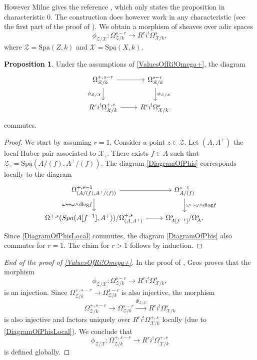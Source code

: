 \documentclass{amsart}
\def\Spa{\textrm{Spa}}
\theoremstyle{definition}
\newtheorem{proposition}[theorem]{Proposition}
\newcommand\dlog{\mathrm{dlog}}
\numberwithin{equation}{section}
\begin{document}
However Milne gives the reference \cite[III.8]{HartshorneAmple}, which only states the proposition in characteristic $0$. The construction does however work in any characteristic (see the first part of the proof of \cite[Theorem III.8.1]{HartshorneAmple}). We obtain a morphism of sheaves over adic spaces
\[
\phi_{\mathcal{Z}/\mathcal{X}}:\Omega_{\mathcal{Z}/k}^{s-r}\to R^ri^!\Omega_{\mathcal{X}/k}^s,
\]
where $\mathcal{Z}=\Spa(Z,k)$ and $\mathcal{X}=\Spa(X,k)$.

\begin{proposition}\label{CommutingLocal}
	Under the assumptions of \cref{ValuesOfRi!Omega+}, the diagram
	\begin{equation}\label{DiagramOfPhis}
		\begin{tikzcd}
			\Omega_{\mathcal{Z}/k}^{+,s-r}\ar[r]\ar[d,swap,"\phi_{\mathcal{Z}/\mathcal{X}}"]&\Omega_{\mathcal{Z}/k}^{s-r}\ar[d,"\phi_{\mathcal{Z}/\mathcal{X}}"]\\ 
			R^ri^!\Omega_{\mathcal{X}/k}^{+,s}\ar[r]& R^ri^!\Omega_{\mathcal{X}/k}^s.
		\end{tikzcd}
	\end{equation}
	commutes.
\end{proposition}
\begin{proof}
	We start by assuming $r=1$. Consider a point $z\in \mathcal{Z}$. Let $(A,A^+)$ the local Huber pair associated to $\mathcal{X}_z$. There exists $f\in A$ such that $\mathcal{Z}_z=\Spa(A/(f),A^+/(f))$. The diagram \eqref{DiagramOfPhis} corresponds locally to the diagram
	\begin{equation}\label{DiagramOfPhisLocal}
		\begin{tikzcd}
			\Omega_{(A/(f),A^+/(f))}^{+,s-1}\ar[r]\ar[d,swap,"\omega\mapsto \omega\wedge\dlog f"]&\Omega_{A/(f)}^{s-1}\ar[d,"\omega\mapsto \omega\wedge\dlog f"]\\
			\Omega^{+,s}(\Spa(A[f^{-1}],A^+))/\Omega^{+,s}_{(A,A^+)}\ar[r]&\Omega^{s}_{A[f^{-1}]}/\Omega^{s}_{A}.
		\end{tikzcd}
	\end{equation}
	Since \eqref{DiagramOfPhisLocal} commutes, the diagram \eqref{DiagramOfPhis} also commutes for $r=1$. The claim for $r>1$ follows by induction.
\end{proof}
\begin{proof}[End of the proof of \cref{ValuesOfRi!Omega+}]
	In the proof of \cite[Théorème 3.5.8]{CohomologyLogGros}, Gros proves that the morphism
	\[
	\phi_{\mathcal{Z}/\mathcal{X}}:\Omega_{\mathcal{Z}/k}^{s-r}\to R^ri^!\Omega_{\mathcal{X}/k}^s,
	\]
	is an injection. Since $\Omega^{+,s-r}_{\mathcal{Z}/k}\to \Omega^{s-r}_{\mathcal{Z}/k}$ is also injective, the morphism 
	\[
	\Omega^{+,s-r}_{\mathcal{Z}/k}\to\Omega_{\mathcal{Z}/k}^{s-r}\xrightarrow{\Phi_{\mathcal{Z}/\mathcal{X}}}R^ri^!\Omega_{\mathcal{X}/k}^s
	\]
	is also injective and factors uniquely over $R^ri^!\Omega^{+,s}_{\mathcal{X}/k}$ locally (due to \eqref{DiagramOfPhisLocal}). We conclude that 
	\[
	\phi_{\mathcal{Z}/\mathcal{X}}: \Omega^{+,s-r}_{\mathcal{Z}/k}\to R^ri^!\Omega^{+,s}_{\mathcal{X}/k}
	\]
	is defined globally.
\end{proof}
\end{document}
